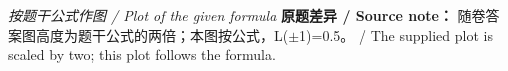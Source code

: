 

\emph{按题干公式作图 / Plot of the given formula}
\textbf{原题差异 / Source note：} 随卷答案图高度为题干公式的两倍；本图按公式，L(\ensuremath{\pm}1)=0.5。 / The supplied plot is scaled by two; this plot follows the formula.
